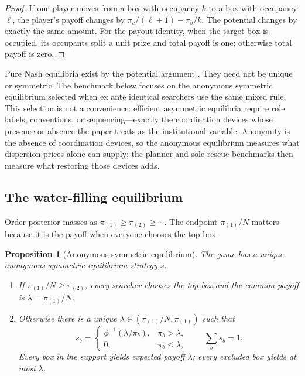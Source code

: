 \documentclass[11pt]{article}
\newtheorem{proposition}{Proposition}
\theoremstyle{definition}
\theoremstyle{remark}
\newcommand{\1}{\mathbf{1}}
\begin{document}
\begin{proof}
If one player moves from a box with occupancy $k$ to a box with occupancy $\ell$, the player's payoff changes by $\pi_c/(\ell+1)-\pi_b/k$. The potential changes by exactly the same amount. For the payout identity, when the target box is occupied, its occupants split a unit prize and total payoff is one; otherwise total payoff is zero.
\end{proof}

Pure Nash equilibria exist by the potential argument \citep{Rosenthal1973,MondererShapley1996}. They need not be unique or symmetric. The benchmark below focuses on the anonymous symmetric equilibrium selected when ex ante identical searchers use the same mixed rule. This selection is not a convenience: efficient asymmetric equilibria require role labels, conventions, or sequencing---exactly the coordination devices whose presence or absence the paper treats as the institutional variable. Anonymity is the absence of coordination devices, so the anonymous equilibrium measures what dispersion prices alone can supply; the planner and sole-rescue benchmarks then measure what restoring those devices adds.

\subsection{The water-filling equilibrium}

Order posterior masses as $\pi_{(1)}\ge\pi_{(2)}\ge\cdots$. The endpoint $\pi_{(1)}/N$ matters because it is the payoff when everyone chooses the top box.

\begin{proposition}[Anonymous symmetric equilibrium]
\label{prop:waterfill}
The game has a unique anonymous symmetric equilibrium strategy $s$.

\begin{enumerate}[label=(\roman*)]
\item If $\pi_{(1)}/N\ge\pi_{(2)}$, every searcher chooses the top box and the common payoff is $\lambda=\pi_{(1)}/N$.
\item Otherwise there is a unique $\lambda\in(\pi_{(1)}/N,\pi_{(1)})$ such that
\begin{equation}
s_b=
\begin{cases}
\phi^{-1}(\lambda/\pi_b), & \pi_b>\lambda,\\
0, & \pi_b\le\lambda,
\end{cases}
\qquad
\sum_b s_b=1.
\label{eq:waterfill}
\end{equation}
Every box in the support yields expected payoff $\lambda$; every excluded box yields at most $\lambda$.
\end{enumerate}
\end{proposition}
\end{document}
